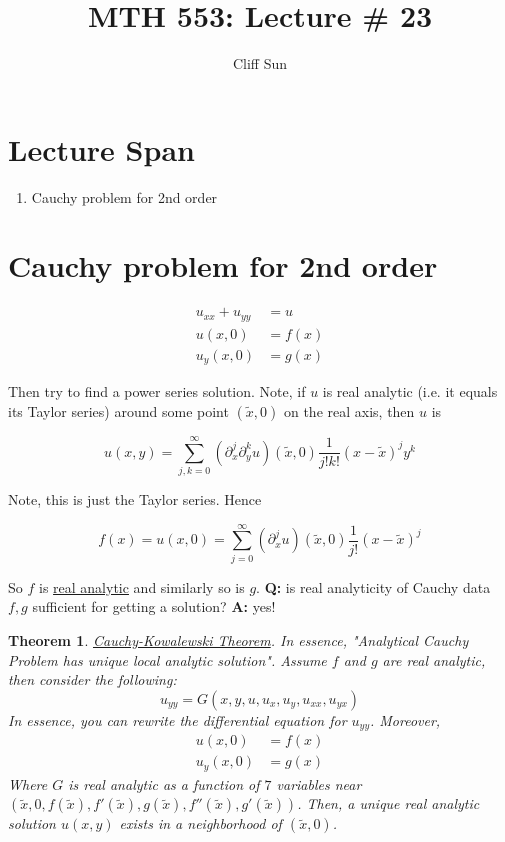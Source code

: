 \documentclass{article}
\title{MTH 553: Lecture \# 23}
\author{Cliff Sun}
\newtheorem{theorem}{Theorem}[section]
\newtheorem{one minute paper}[theorem]{One Minute Paper}
\begin{document}
\maketitle

\section*{Lecture Span}
\begin{enumerate}
    \item Cauchy problem for 2nd order
\end{enumerate}

\section*{Cauchy problem for 2nd order}

\begin{align*}
    u_{xx} + u_{yy} &= u \\
    u(x,0) &= f(x) \\
    u_y(x,0) &= g(x)
\end{align*}

Then try to find a power series solution. Note, if $u$ is real analytic (i.e. it equals its Taylor series) around some point $(\tilde{x},0)$ on the real axis, then $u$ is 

\begin{equation}
    u(x,y) = \sum_{j,k=0}^{\infty}\left( \partial_x^{j}\partial_{y}^{k}u \right)(\tilde{x},0)\frac{1}{j!k!}(x - \tilde{x})^{j}y^k
\end{equation}

Note, this is just the Taylor series. Hence 

\begin{equation}
    f(x) = u(x,0) = \sum_{j=0}^{\infty}\left( \partial_{x}^{j}u \right)(\tilde{x},0)\frac{1}{j!}(x - \tilde{x})^{j}
\end{equation}

So $f$ is \underline{real analytic} and similarly so is $g$. \textbf{Q:} is real analyticity of Cauchy data $f,g$ sufficient for getting a solution? \textbf{A:} yes!

\begin{theorem}
    \underline{Cauchy-Kowalewski Theorem}. In essence, "Analytical Cauchy Problem has unique local analytic solution". Assume $f$ and $g$ are real analytic, then consider the following:
    \begin{equation}
        u_{yy} = G(x,y,u,u_x,u_y,u_{xx},u_{yx})
    \end{equation}
    In essence, you can rewrite the differential equation for $u_{yy}$. Moreover, 
    \begin{align}
        u(x,0) &= f(x) \\
        u_y(x,0) &= g(x)
    \end{align}
    Where $G$ is real analytic as a function of $7$ variables near $(\tilde{x},0, f(\tilde{x}), f'(\tilde{x}), g(\tilde{x}), f''(\tilde{x}), g'(\tilde{x}))$.
    Then, a unique real analytic solution $u(x,y)$ exists in a neighborhood of $(\tilde{x},0)$. 
\end{theorem}
\end{document}
